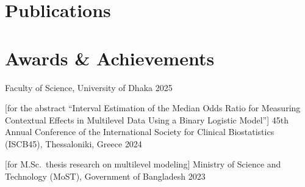 \documentclass[letterpaper,11pt]{article}
\begin{document}

\ifcv
\section*{Publications}


\nocite{*}
\printbibliography[heading=none, prenote=symbols]
\fi



\section*{Awards \& Achievements}

\begin{itemize}
            {Faculty of Science, University of Dhaka}
            {2025}

            [for the abstract ``Interval Estimation of the Median Odds
            Ratio for Measuring Contextual Effects in Multilevel Data Using a
            Binary Logistic Model'']
            {45th Annual Conference of the International Society for Clinical
            Biostatistics (ISCB45), Thessaloniki, Greece}
            {2024}


            [for M.Sc.\ thesis research on multilevel modeling]
            {Ministry of Science and Technology (MoST), Government of Bangladesh}
            {2023}
\end{itemize}


\end{document}
